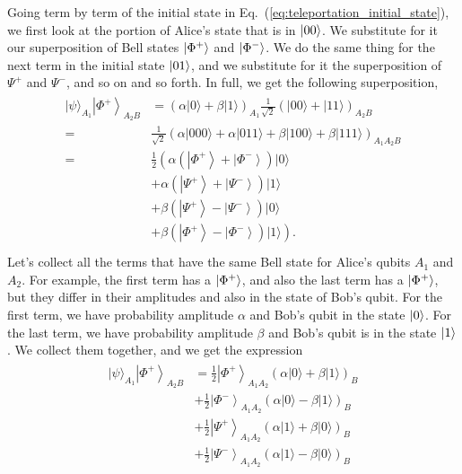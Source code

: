 Going term by term of the initial state in Eq.~(\ref{eq:teleportation_initial_state}), we first look at the portion of Alice's state that is in $\left| 00 \right\rangle$.
We substitute for it our superposition of Bell states $\left| \Phi^+ \right\rangle$ and $\left| \Phi^- \right\rangle$.
We do the same thing for the next term in the initial state $\left| 01 \right\rangle$, and we substitute for it the superposition of $\Psi^+$ and $\Psi^-$, and so on and so forth.
In full, we get the following superposition,
\begin{align}
    \begin{aligned}
        |\psi\rangle_{A_{1}}\left|\Phi^{+}\right\rangle_{A_{2} B} &=(\alpha|0\rangle+\beta|1\rangle)_{A_{1}} \frac{1}{\sqrt{2}}(|00\rangle+|11\rangle)_{A_{2} B} \\
        =&\frac{1}{\sqrt{2}}(\alpha|000\rangle+\alpha|011\rangle+\beta|100\rangle+\beta|111\rangle)_{A_{1} A_{2} B} \\
        =& \frac{1}{2}\left(\alpha\left(\left|\Phi^{+}\right\rangle+\left|\Phi^{-}\right\rangle\right)|0\rangle\right.\\
        &+\alpha\left(\left|\Psi^{+}\right\rangle+\left|\Psi^{-}\right\rangle\right)|1\rangle \\
        &+\beta\left(\left|\Psi^{+}\right\rangle-\left|\Psi^{-}\right\rangle\right)|0\rangle \\
        &\left.+\beta\left(\left|\Phi^{+}\right\rangle-\left|\Phi^{-}\right\rangle\right)|1\rangle\right). \\
\end{aligned}
\end{align}
Let's collect all the terms that have the same Bell state for Alice's qubits $A_1$ and $A_2$.
For example, the first term has a $\left| \Phi^+ \right\rangle$, and also the last term has a $\left| \Phi^+ \right\rangle$, but they differ in their amplitudes and also in the state of Bob's qubit.
For the first term, we have probability amplitude $\alpha$ and Bob's qubit in the state $\left| 0 \right\rangle$.
For the last term, we have probability amplitude $\beta$ and Bob's qubit is in the state $\left| 1 \right\rangle$.
We collect them together, and we get the expression
\begin{align}
\begin{aligned}
    |\psi\rangle_{A_{1}}\left|\Phi^{+}\right\rangle_{A_{2} B} & = \frac{1}{2}\left|\Phi^{+}\right\rangle_{A_{1} A_{2}}(\alpha|0\rangle+\beta|1\rangle)_{B} \\
    & + \frac{1}{2}\left|\Phi^{-}\right\rangle_{A_{1} A_{2}}(\alpha|0\rangle-\beta|1\rangle)_{B} \\
    & + \frac{1}{2}\left|\Psi^{+}\right\rangle_{A_{1} A_{2}}(\alpha|1\rangle+\beta|0\rangle)_{B} \\
    & + \frac{1}{2}\left|\Psi^{-}\right\rangle_{A_{1} A_{2}}(\alpha|1\rangle-\beta|0\rangle)_{B}
\end{aligned}
\label{eq:teleport-alice-basis}
\end{align}


